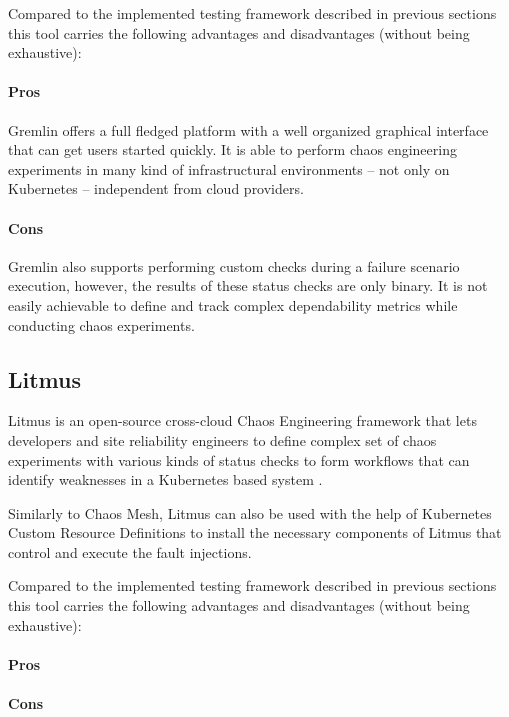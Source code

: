 Compared to the implemented testing framework described in previous sections this tool carries the following advantages and disadvantages (without being exhaustive):

\paragraph{Pros} Gremlin offers a full fledged platform with a well organized graphical interface that can get users started quickly. It is able to perform chaos engineering experiments in many kind of infrastructural environments -- not only on Kubernetes -- independent from cloud providers.

\paragraph{Cons} Gremlin also supports performing custom checks during a failure scenario execution, however, the results of these status checks are only binary. It is not easily achievable to define and track complex dependability metrics while conducting chaos experiments.

\subsection{Litmus}

Litmus is an open-source cross-cloud Chaos Engineering framework that lets developers and site reliability engineers to define complex set of chaos experiments with various kinds of status checks to form workflows that can identify weaknesses in a Kubernetes based system \cite{Litmus}.

Similarly to Chaos Mesh, Litmus can also be used with the help of Kubernetes Custom Resource Definitions to install the necessary components of Litmus that control and execute the fault injections.

Compared to the implemented testing framework described in previous sections this tool carries the following advantages and disadvantages (without being exhaustive):

\paragraph{Pros}

\paragraph{Cons}
